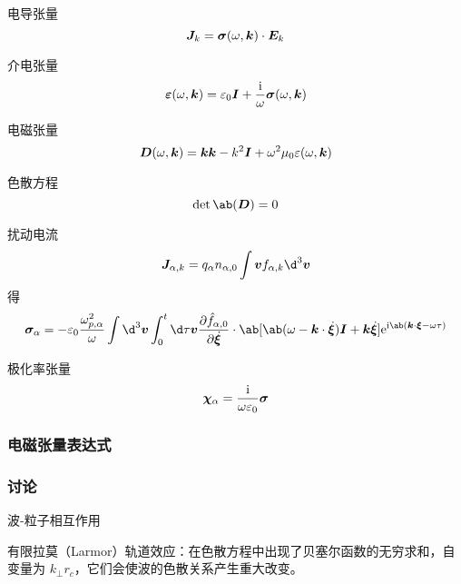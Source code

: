 电导张量
\begin{equation}
\bm{J}_k = \bm{\sigma}(\omega, \bm{k}) \cdot \bm{E}_k
\end{equation}

介电张量
\begin{equation}
\bm{\varepsilon}(\omega, \bm{k})
= \varepsilon_0 \bm{I}
+ \frac{\mathrm{i}}{\omega} \bm{\sigma}(\omega, \bm{k})
\end{equation}

电磁张量
\begin{equation}
\bm{D}(\omega, \bm{k})
= \bm{k}\bm{k} - k^2 \bm{I}
+ \omega^2 \mu_0 \varepsilon(\omega, \bm{k})
\end{equation}

色散方程
\begin{equation}
\det\ab(\vector{D}) = 0
\end{equation}

扰动电流
\begin{equation}
\vector{J}_{\alpha,k} = q_\alpha n_{\alpha,0}
\int \vector{v} f_{\alpha,k} \d^3\vector{v}
\end{equation}
得
\begin{equation}
\vector{\sigma}_\alpha = - \varepsilon_0 \frac{\omega_{p,\alpha}^2}{\omega}
\int \d^3\vector{v} \int_0^{t} \d\tau
\vector{v} \pdv{\hat{f}_{\alpha,0}}{\dot{\vector{\xi}}} \cdot \ab[
    \ab(\omega - \vector{k}\cdot\dot{\vector{\xi}}) \vector{I}
    + \vector{k} \dot{\vector{\xi}}
] \eu^{\im \ab(\vector{k} \cdot \vector{\xi} - \omega \tau)}
\end{equation}

极化率张量
\begin{equation}
\bm{\chi}_\alpha = \frac{\mathrm{i}}{\omega \varepsilon_0} \bm{\sigma}
\end{equation}

\subsubsection{电磁张量表达式}

\subsubsection{讨论}

波-粒子相互作用

有限拉莫（Larmor）轨道效应：在色散方程中出现了贝塞尔函数的无穷求和，自变量为 $k_\perp r_c$，它们会使波的色散关系产生重大改变。


